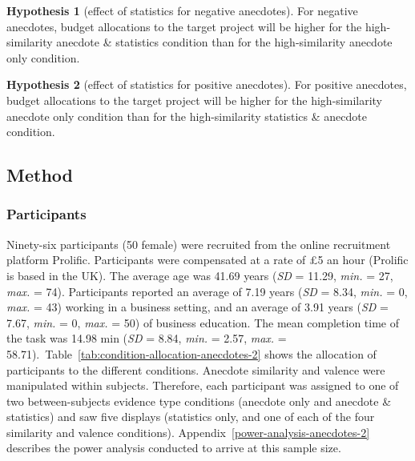 \documentclass[a4paper, nobind]{templates/ociamthesis}
\theoremstyle{definition}
\theoremstyle{definition}
\theoremstyle{definition}
\theoremstyle{definition}
\newtheorem{hypothesis}{Hypothesis}[chapter]
\theoremstyle{remark}
\begin{document}
\begin{hypothesis}[effect of statistics for negative anecdotes]
\protect\hypertarget{hyp:statistics-negative-anecdotes-2}{}{\label{hyp:statistics-negative-anecdotes-2} \iffalse (effect of statistics for negative anecdotes) \fi{} }For negative anecdotes, budget allocations to the target project will be higher
for the high-similarity anecdote \& statistics condition than for the
high-similarity anecdote only condition.
\end{hypothesis}

\begin{hypothesis}[effect of statistics for positive anecdotes]
\protect\hypertarget{hyp:statistics-positive-anecdotes-2}{}{\label{hyp:statistics-positive-anecdotes-2} \iffalse (effect of statistics for positive anecdotes) \fi{} }For positive anecdotes, budget allocations to the target project will be higher
for the high-similarity anecdote only condition than for the high-similarity
statistics \& anecdote condition.
\end{hypothesis}

\subsection{Method}

\subsubsection{Participants}

Ninety-six participants (50 female) were recruited from the online recruitment platform Prolific. Participants were compensated at a rate of \pounds 5 an hour (Prolific is based in the UK). The average age was 41.69 years (\emph{SD} = 11.29, \emph{min.} = 27, \emph{max.} = 74). Participants reported an average of 7.19 years (\emph{SD} = 8.34, \emph{min.} = 0, \emph{max.} = 43) working in a business setting, and an average of 3.91 years (\emph{SD} = 7.67, \emph{min.} = 0, \emph{max.} = 50) of business education. The mean completion time of the task was 14.98 min (\emph{SD} = 8.84, \emph{min.} = 2.57, \emph{max.} = 58.71).~Table~\ref{tab:condition-allocation-anecdotes-2}
shows the allocation of participants to the different conditions. Anecdote
similarity and valence were manipulated within subjects. Therefore, each
participant was assigned to one of two between-subjects evidence type conditions
(anecdote only and anecdote \& statistics) and saw five displays (statistics
only, and one of each of the four similarity and valence conditions).
Appendix~\ref{power-analysis-anecdotes-2} describes the power analysis
conducted to arrive at this sample size.
\end{document}
